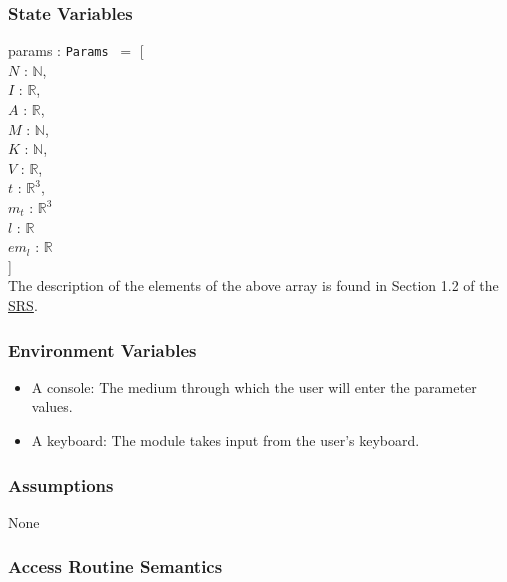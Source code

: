 \documentclass[12pt, titlepage]{article}
\begin{document}
\subsubsection{State Variables}
params : \texttt{Params} $\:= $ [ \\ 
$N$ : $\mathbb{N}$, \\
$I$ : $\mathbb{R}$, \\
$A$ : $\mathbb{R}$, \\
$M$ : $\mathbb{N}$, \\
$K$ : $\mathbb{N}$, \\
$V$ : $\mathbb{R}$, \\
$t$ : $\mathbb{R}^3$, \\
$m_t$ : $\mathbb{R}^3$ \\
$l$ : $\mathbb{R}$ \\
$em_l$ : $\mathbb{R}$ \\
] \\
The description of the elements of the above array is found in Section 1.2 of the \href{https://github.com/husseinsd1/optimal-em-arrangement/blob/main/docs/SRS/SRS.pdf}{SRS}.

\subsubsection{Environment Variables}
\begin{itemize}
  \item A console: The medium through which the user will enter the parameter values. 
  \item A keyboard: The module takes input from the user's keyboard. 
\end{itemize}

\subsubsection{Assumptions}
None 

\subsubsection{Access Routine Semantics}
\end{document}
